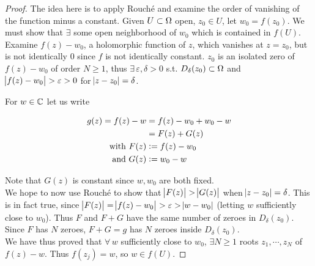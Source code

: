 \begin{proof}
The idea here is to apply Rouché and examine the order of vanishing of the function minus a constant. Given $U \subset \Omega$ open, $z_0 \in U$, let $w_0 = f(z_0)$. We must show that $ \exists $ some open neighborhood of $w_0$ which is contained in $f(U)$.\\

Examine $f(z) - w_0$, a holomorphic function of $z$, which vanishes at $z=z_0$, but is not identically $0$ since $f$ is not identically constant. $z_0$ is an isolated zero of $f(z) - w_0$ of order $N \geq 1$, thus $\exists \, \varepsilon,\delta > 0$ s.t. $D_\delta (z_0) \subset \Omega$ and $\abs{f(z)-w_0} > \varepsilon> 0 $ for $\abs{z-z_0} = \delta$.



\begin{center}

\end{center}



For $w \in \mathbb{C}$ let us write 


\begin{align*}
g(z) = f(z) - w &= f(z) - w_0 +w_0 -w\\
&=F(z) + G(z)\\
\text{with } F(z) &\vcentcolon= f(z) - w_0\\
\text{and } G(z) &\vcentcolon= w_0 - w\\
\end{align*}

Note that $G(z)$ is constant since $w,w_0$ are both fixed.\\

We hope to now use Rouché to show that $\abs{F(z)} > \abs{G(z)} $ when $\abs{z-z_0} = \delta$. This is in fact true, since $\abs{F(z)} = \abs{f(z)-w_0} > \varepsilon > \abs{w-w_0}$ (letting $w$ sufficiently close to $w_0$). Thus $F$ and $F+G$ have the same number of zeroes in $D_\delta (z_0)$. Since $F$ has $N$ zeroes, $F+G = g$ has $N$ zeroes inside $D_\delta (z_0)$.\\


We have thus proved that $\forall \, w$ sufficiently close to $w_0$, $\exists N \geq 1$ roots $z_1, \cdots , z_N$ of $f(z) - w$. Thus $f(z_j) = w$, so $w \in f(U)$.
\end{proof}

